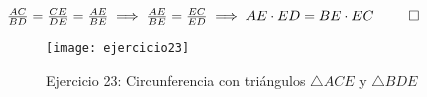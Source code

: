 \documentclass[12pt]{article}
\begin{document}
\begin{enumerate}
\begin{center}
$\frac{AC}{BD} = \frac{CE}{DE} = \frac{AE}{BE} \implies \frac{AE}{BE} = \frac{EC}{ED} \implies AE \cdot ED = BE \cdot EC \hspace{5 pt}\qed$
\end{center}

\begin{figure}[h]
	\centering
	\texttt{[image: ejercicio23]}
	\caption{Ejercicio 23: Circunferencia con triángulos $\bigtriangleup ACE$ y $\bigtriangleup BDE$}\label{fig:2}		
\end{figure}
 
\end{enumerate}

\noindent
\end{document}
